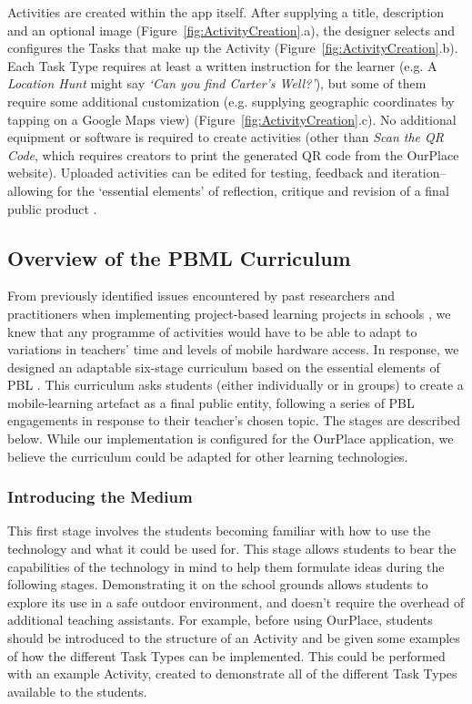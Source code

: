 \documentclass[,hyphens]{sigchi}
\begin{document}
Activities are created within the app itself. After supplying a title, description and an optional image (Figure~\ref{fig:ActivityCreation}.a), the designer selects and configures the Tasks that make up the Activity (Figure~\ref{fig:ActivityCreation}.b). Each Task Type requires at least a written instruction for the learner (e.g. A \textit{Location Hunt} might say \textit{`Can you find Carter's Well?'}), but some of them require some additional customization (e.g. supplying geographic coordinates by tapping on a Google Maps view) (Figure~\ref{fig:ActivityCreation}.c). No additional equipment or software is required to create activities (other than \textit{Scan the QR Code}, which requires creators to print the generated QR code from the OurPlace website). Uploaded activities can be edited for testing, feedback and iteration--allowing for the `essential elements' of reflection, critique and revision of a final public product \cite{Larmer2015}. 

\subsection{Overview of the PBML Curriculum}

From previously identified issues encountered by past researchers and practitioners when implementing project-based learning projects in schools \cite{Blumenfeld1991, Krajcik2006, InnovationUnit2016, TheEducationEndowmentFoundation2016}, we knew that any programme of activities would have to be able to adapt to variations in teachers' time and levels of mobile hardware access. In response, we designed an adaptable six-stage curriculum based on the essential elements of PBL \cite{Larmer2015}. This curriculum asks students (either individually or in groups) to create a mobile-learning artefact as a final public entity, following a series of PBL engagements in response to their teacher's chosen topic. The stages are described below. While our implementation is configured for the OurPlace application, we believe the curriculum could be adapted for other learning technologies.

\subsubsection{Introducing the Medium}
This first stage involves the students becoming familiar with how to use the technology and what it could be used for. This stage allows students to bear the capabilities of the technology in mind to help them formulate ideas during the following stages. Demonstrating it on the school grounds allows students to explore its use in a safe outdoor environment, and doesn't require the overhead of additional teaching assistants. For example, before using OurPlace, students should be introduced to the structure of an Activity and be given some examples of how the different Task Types can be implemented. This could be performed with an example Activity, created to demonstrate all of the different Task Types available to the students.
\end{document}

